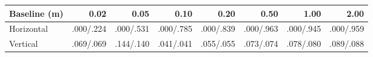 \begin{tabular}{lrrrrrrr}
\toprule
Baseline (m) & 0.02 & 0.05 & 0.10 & 0.20 & 0.50 & 1.00 & 2.00 \\
\midrule
Horizontal & .000/.224 & .000/.531 & .000/.785 & .000/.839 & .000/.963 & .000/.945 & .000/.959 \\
Vertical & .069/.069 & .144/.140 & .041/.041 & .055/.055 & .073/.074 & .078/.080 & .089/.088 \\
\bottomrule
\end{tabular}